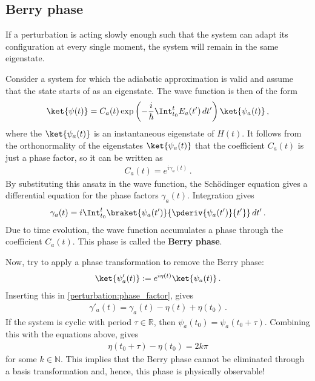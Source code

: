 \subsection{Berry phase}

    \begin{theorem}
        If a perturbation is acting slowly enough such that the system can adapt its configuration at every single moment, the system will remain in the same eigenstate.
    \end{theorem}

    Consider a system for which the adiabatic approximation is valid and assume that the state starts of as an eigenstate. The wave function is then of the form
    \begin{gather}
        \ket{\psi(t)} = C_a(t)\exp\left(-\frac{i}{\hbar}\Int_{t_0}^tE_a(t')\,dt'\right)\ket{\psi_a(t)}\,,
    \end{gather}
    where the $\ket{\psi_a(t)}$ is an instantaneous eigenstate of $\widehat{H}(t)$. It follows from the orthonormality of the eigenstates $\ket{\psi_a(t)}$ that the coefficient $C_a(t)$ is just a phase factor, so it can be written as
    \begin{gather}
        C_a(t) = e^{i\gamma_a(t)}\,.
    \end{gather}
    By substituting this ansatz in the wave function, the Sch\"odinger equation gives a differential equation for the phase factors $\gamma_a(t)$. Integration gives
    \begin{gather}
        \label{perturbation:phase_factor}
        \gamma_a(t) = i\Int_{t_0}^t\braket{\psi_a(t')}{\pderiv{\psi_a(t')}{t'}}\,dt'\,.
    \end{gather}
    Due to time evolution, the wave function accumulates a phase through the coefficient $C_a(t)$. This phase is called the \textbf{Berry phase}.

    Now, try to apply a phase transformation to remove the Berry phase:
    \begin{gather}
        \label{perturbation:phase_transform}
        \ket{\psi'_a(t)} := e^{i\eta(t)}\ket{\psi_a(t)}\,.
    \end{gather}
    Inserting this in \cref{perturbation:phase_factor}, gives
    \begin{gather}
        \gamma'_a(t) = \gamma_a(t) - \eta(t) + \eta(t_0)\,.
    \end{gather}
    If the system is cyclic with period $\tau\in\mathbb{R}$, then $\psi_a(t_0) = \psi_a(t_0+\tau)$. Combining this with the equations above, gives
    \begin{gather}
        \eta(t_0+\tau) - \eta(t_0) = 2k\pi
    \end{gather}
    for some $k\in\mathbb{N}$. This implies that the Berry phase cannot be eliminated through a basis transformation and, hence, this phase is physically observable!

